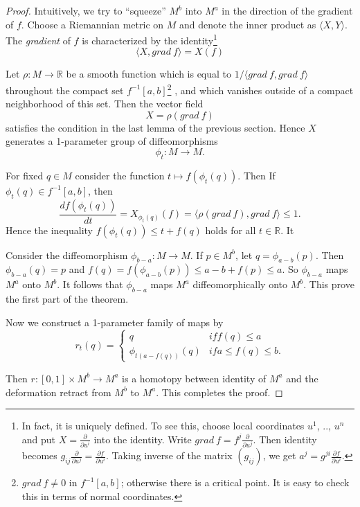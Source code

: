 \documentclass[a4paper,11pt,reqno]{amsart}
\newcommand{\RR}{\mathbb{R}}      %
\begin{document}
\begin{proof}
  Intuitively, we try to ``squeeze'' $M^b$ into $M^a$ in the direction of the
  gradient of $f$. Choose a Riemannian metric on $M$ and denote the inner
  product as $\langle X, Y \rangle$. The \emph{gradient} of $f$ is characterized
  by the identity\footnote{In fact, it is uniquely defined. To see this, choose
    local coordinates $u^1$, .., $u^n$ and put $X = \frac{\partial}{\partial
      u^i}$ into the identity. Write $grad \: f = f^j\frac{\partial}{\partial
      u^j}$. Then identity becomes $g_{ij}\frac{\partial}{\partial u^j} =
    \frac{\partial f}{\partial u^i}$. Taking inverse of the matrix $(g_{ij})$,
    we get $a^j = g^{ji}\frac{\partial f}{\partial u^i}$.}
  \begin{equation}
    \langle X, grad \: f\rangle = X(f)
  \end{equation}
  
  Let $\rho : M \to \RR$ be a smooth function which is equal to $1/\langle grad
  \: f, grad \: f \rangle$ throughout the compact set
  $f^{-1}[a,b]$\footnote{$grad \: f \ne 0$ in $f^{-1}[a,b]$; otherwise there is
    a critical point. It is easy to check this in terms of normal coordinates.}
  , and which vanishes outside of a compact neighborhood of this set. Then the
  vector field 
  \begin{equation}
    X = \rho (grad \: f)
  \end{equation}
  satisfies the condition in the last lemma of the previous section. Hence $X$
  generates a 1-parameter group of diffeomorphisms
  \begin{equation}
    \phi_t : M \to M.
  \end{equation}

  For fixed $q \in M$ consider the function $t \mapsto f(\phi_t(q))$. Then If
  $\phi_t(q) \in f^{-1}[a,b]$, then
  \begin{equation}
    \frac{d f(\phi_t(q))}{dt} = X_{\phi_t(q)}(f) = 
    \langle \rho(grad \:  f), grad \: f \rangle \le 1.
  \end{equation}
  Hence the inequality $f(\phi_t(q)) \le t + f(q)$ holds for all $t \in \RR$. It

  Consider the diffeomorphism $\phi_{b-a} : M \to M$. If $p \in M^b$, let $q =
  \phi_{a-b}(p)$. Then $\phi_{b-a}(q) = p$ and $f(q) = f(\phi_{a-b}(p)) \le
  a-b+f(p) \le a$. So $\phi_{b-a}$ maps $M^a$ onto $M^b$. It follows that
  $\phi_{b-a}$ maps $M^a$ diffeomorphically onto $M^b$. This prove the first
  part of the theorem.

  Now we construct a 1-parameter family of maps by
  \begin{equation}
    r_t(q) =
    \begin{cases}
      q & if f(q) \le a \\
      \phi_{t(a-f(q))}(q) & if a \le f(q) \le b.
    \end{cases}
  \end{equation}

  Then $r : [0,1] \times M^b \to M^a$ is a homotopy between identity of $M^a$
  and the deformation retract from $M^b$ to $M^a$. This completes the proof.
\end{proof}
\end{document}
